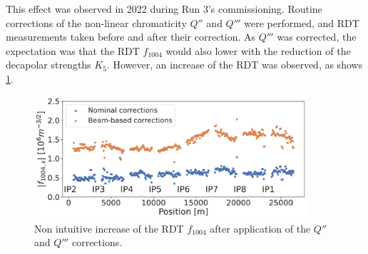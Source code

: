 This effect was observed in 2022 during Run 3's commissioning. Routine corrections of the non-linear
chromaticity $Q''$ and $Q'''$ were performed, and RDT measurements taken before and after their
correction. As $Q'''$ was corrected, the expectation was that the RDT $f_{1004}$ would also lower
with the reduction of the decapolar strengths $K_5$. However, an increase of the RDT was observed,
as shows \cref{fig:decapoles:f1004_dq2_dq3}.

\begin{figure}[H]
    \centering
    \includegraphics[width=0.9\textwidth]{./images/f1004_dq2_dq3_2022.pdf}    
    \caption{Non intuitive increase of the RDT $f_{1004}$ after application of the $Q''$ and $Q'''$
    corrections.}
    \label{fig:decapoles:f1004_dq2_dq3}
\end{figure}

